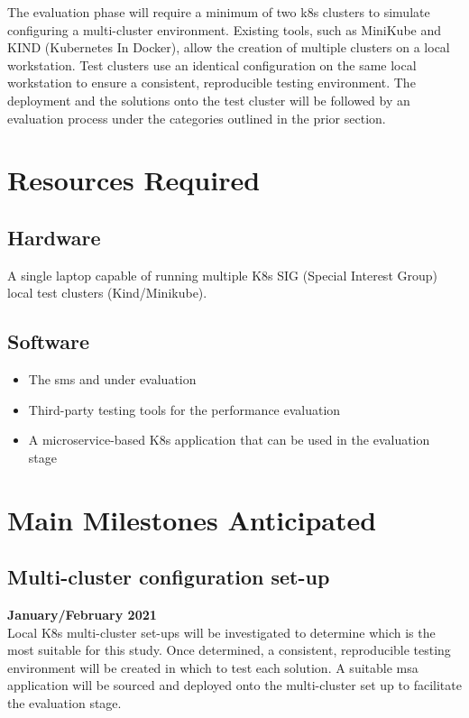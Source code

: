 \documentclass[12pt, a4paper, oneside]{article}
\begin{document}
The evaluation phase will require a minimum of two \acrshort{k8s} clusters to simulate configuring a multi-cluster environment. Existing tools, such as MiniKube and KIND (Kubernetes In Docker), allow the creation of multiple clusters on a local workstation. Test clusters use an identical configuration on the same local workstation to ensure a consistent, reproducible testing environment. The deployment and the solutions onto the test cluster will be followed by an evaluation process under the categories outlined in the prior section.
\newpage

\section{Resources Required}
\subsection{Hardware}
A single laptop capable of running multiple K8s SIG (Special Interest Group) local test clusters (Kind/Minikube).
\subsection{Software}
\begin{itemize}
	\item The \acrshort{sm}s and under evaluation
	\item Third-party testing tools for the performance evaluation
	\item A microservice-based K8s application that can be used in the evaluation stage
\end{itemize}
\newpage

\section{Main Milestones Anticipated}
\subsection{Multi-cluster configuration set-up}
\textbf{January/February 2021}\\
Local K8s multi-cluster set-ups will be investigated to determine which is the most suitable for this study. Once determined, a consistent, reproducible testing environment will be created in which to test each solution. A suitable \acrshort{msa} application will be sourced and deployed onto the multi-cluster set up to facilitate the evaluation stage. 
\end{document}
